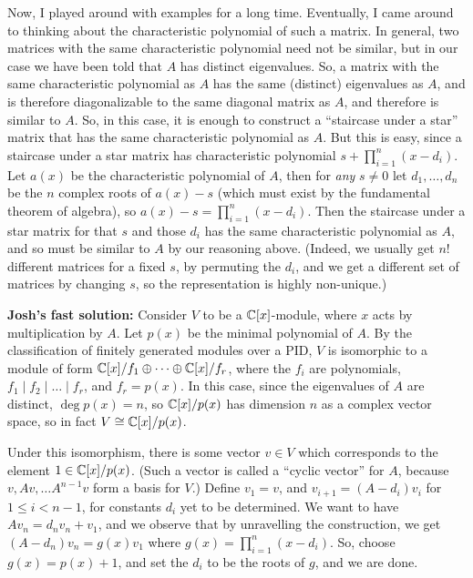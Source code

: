 \begin{solution}
Now, I played around with examples for a long time. Eventually, I came around to thinking about the characteristic polynomial of such a matrix. In general, two matrices with the same characteristic polynomial need not be similar, but in our case we have been told that $A$ has distinct eigenvalues. So, a matrix with the same characteristic polynomial as $A$ has the same (distinct) eigenvalues as $A$, and is therefore diagonalizable to the same diagonal matrix as $A$, and therefore is similar to $A$. So, in this case, it is enough to construct a ``staircase under a star'' matrix that has the same characteristic polynomial as $A$. But this is easy, since a staircase under a star matrix has characteristic polynomial $s + \prod_{i=1}^n (x-d_i)$. Let $a(x)$ be the characteristic polynomial of $A$, then for \emph{any} $s \neq 0$ let $d_1,\dots,d_n$ be the $n$ complex roots of $a(x) - s$ (which must exist by the fundamental theorem of algebra), so $a(x) - s = \prod_{i=1}^n (x-d_i)$. Then the staircase under a star matrix for that $s$ and those $d_i$ has the same characteristic polynomial as $A$, and so must be similar to $A$ by our reasoning above. (Indeed, we usually get $n!$ different matrices for a fixed $s$, by permuting the $d_i$, and we get a different set of matrices by changing $s$, so the representation is highly non-unique.)

\textbf{Josh's fast solution:} Consider $V$ to be a $\mathbb{C}[x]$-module, where $x$ acts by multiplication by $A$. Let $p(x)$ be the minimal polynomial of $A$. By the classification of finitely generated modules over a PID, $V$ is isomorphic to a module of form $\mathbb{C}[x]/f_1 \oplus \dots \oplus \mathbb{C}[x]/f_r$, where the $f_i$ are polynomials, $f_1 \mid f_2 \mid \dots \mid f_r$, and $f_r = p(x)$. In this case, since the eigenvalues of $A$ are distinct, $\deg p(x) = n$, so $\mathbb{C}[x]/p(x)$ has dimension $n$ as a complex vector space, so in fact $V \cong \mathbb{C}[x]/p(x)$.

Under this isomorphism, there is some vector $v \in V$ which corresponds to the element $1 \in \mathbb{C}[x]/p(x)$. (Such a vector is called a ``cyclic vector'' for $A$, because $v, Av, \dots A^{n-1}v$ form a basis for $V$.) Define $v_1 = v$, and $v_{i+1} = (A-d_i)v_i$ for $1 \leq i < n-1$, for constants $d_i$ yet to be determined. We want to have $Av_n = d_n v_n + v_1$, and we observe that by unravelling the construction, we get $(A - d_n)v_n = g(x) v_1$ where $g(x) = \prod_{i=1}^n (x-d_i)$. So, choose $g(x) = p(x) + 1$, and set the $d_i$ to be the roots of $g$, and we are done.


\end{solution}
